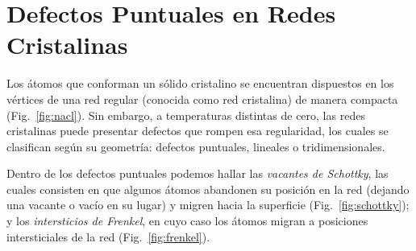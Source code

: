 \documentclass[a4paper,11pt]{article}
\begin{document}
\section{Defectos Puntuales en Redes Cristalinas}

Los átomos que conforman un sólido cristalino se encuentran
dispuestos en los vértices de una red regular (conocida como red
cristalina) de manera compacta (Fig.~\ref{fig:nacl}).
Sin embargo, a temperaturas distintas de cero, las redes cristalinas
puede presentar defectos que rompen esa regularidad, los cuales se
clasifican según su geometría: defectos puntuales, lineales o
tridimensionales.

Dentro de los defectos puntuales podemos hallar las \emph{vacantes de
Schottky}, las cuales consisten en que algunos átomos abandonen su
posición en la red (dejando una vacante o vacío en su lugar) y migren
hacia la superficie (Fig.~\ref{fig:schottky}); y los \emph{intersticios
de Frenkel}, en cuyo caso los átomos migran a posiciones intersticiales
de la red (Fig.~\ref{fig:frenkel}).
\end{document}
